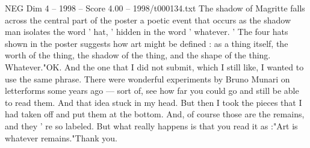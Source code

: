 \begin{textsample}{NEG Dim 4 – 1998 – Score 4.00 – 1998/t000134.txt}
The shadow of Magritte falls across the central part of the poster a poetic event that occurs as the shadow man isolates the word ' hat, ' hidden in the word ' whatever. ' The four hats shown in the poster suggests how art might be defined : as a thing itself, the worth of the thing, the shadow of the thing, and the shape of the thing.
Whatever."OK.
And the one that I did not submit, which I still like, I wanted to use the same phrase.
There were wonderful experiments by Bruno Munari on letterforms some years ago — sort of, see how far you could go and still be able to read them.
And that idea stuck in my head.
But then I took the pieces that I had taken off and put them at the bottom.
And, of course those are the remains, and they ' re so labeled.
But what really happens is that you read it as :"Art is whatever remains."Thank you.

\end{textsample}
